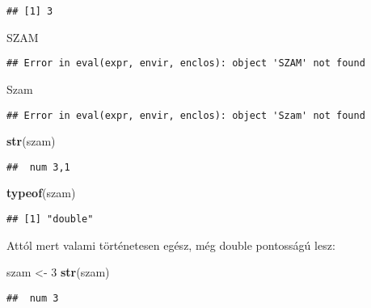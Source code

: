 \documentclass[]{book}
\newenvironment{Shaded}{\begin{snugshade}}{\end{snugshade}}
\newcommand{\KeywordTok}[1]{\textcolor[rgb]{0.13,0.29,0.53}{\textbf{#1}}}
\newcommand{\DecValTok}[1]{\textcolor[rgb]{0.00,0.00,0.81}{#1}}
\newcommand{\StringTok}[1]{\textcolor[rgb]{0.31,0.60,0.02}{#1}}
\newcommand{\NormalTok}[1]{#1}
\begin{document}
\begin{verbatim}
## [1] 3
\end{verbatim}

\begin{Shaded}
\begin{Highlighting}[]
\NormalTok{SZAM}
\end{Highlighting}
\end{Shaded}

\begin{verbatim}
## Error in eval(expr, envir, enclos): object 'SZAM' not found
\end{verbatim}

\begin{Shaded}
\begin{Highlighting}[]
\NormalTok{Szam}
\end{Highlighting}
\end{Shaded}

\begin{verbatim}
## Error in eval(expr, envir, enclos): object 'Szam' not found
\end{verbatim}

\begin{Shaded}
\begin{Highlighting}[]
\KeywordTok{str}\NormalTok{(szam)}
\end{Highlighting}
\end{Shaded}

\begin{verbatim}
##  num 3,1
\end{verbatim}

\begin{Shaded}
\begin{Highlighting}[]
\KeywordTok{typeof}\NormalTok{(szam)}
\end{Highlighting}
\end{Shaded}

\begin{verbatim}
## [1] "double"
\end{verbatim}

Attól mert valami történetesen egész, még double pontosságú lesz:

\begin{Shaded}
\begin{Highlighting}[]
\NormalTok{szam <-}\StringTok{ }\DecValTok{3}
\KeywordTok{str}\NormalTok{(szam)}
\end{Highlighting}
\end{Shaded}

\begin{verbatim}
##  num 3
\end{verbatim}
\end{document}
